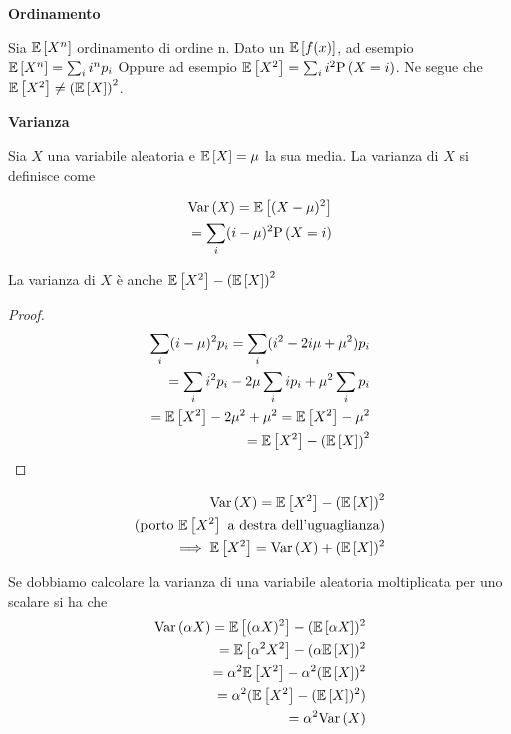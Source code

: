 \begin{defn}
	\textbf{Ordinamento}
	
	Sia $\mathbb{E}\left[X^n\right]$ ordinamento di ordine n.
	Dato un $ \mathbb{E}\left[f(x)\right] $, ad esempio $ \mathbb{E}\left[X^n\right] = \sum_i i^n p_i$
	Oppure ad esempio $ \mathbb{E}\left[X^2\right] = \sum_i i^2 \text{P}\left(X = i\right)$. Ne segue che $ \mathbb{E}\left[X^2\right] \neq \left(\mathbb{E}\left[X\right]\right)^2$.	
\end{defn}


\begin{defn}
	\textbf{Varianza}
	
	Sia $ X $ una variabile aleatoria e $ \mathbb{E}\left[X\right] = \mu $ la sua media.
	La varianza di $ X $ si definisce come 
	
	\begin{equation*}
	\begin{aligned}
	\text{Var}\left(X\right) = \mathbb{E}\left[(X-\mu)^2\right] \\ 
	= \sum_i (i-\mu)^2 \text{P}\left(X = i\right)
	\end{aligned}
	\end{equation*}
	
	La varianza di $ X $ è anche $ \mathbb{E}\left[X^2\right] - \left(\mathbb{E}\left[X\right]\right)^2 $
	
	\begin{proof}
		\begin{equation*}
		\begin{aligned}
		\sum_i (i-\mu)^2 p_i = \sum_i (i^2 -2i\mu + \mu^2) p_i \\
		= \sum_i i^2 p_i - 2\mu \sum_i i p_i + \mu^2 \sum_i p_i \\
		= \mathbb{E}\left[X^2\right] - 2\mu^2 + \mu^2 = \mathbb{E}\left[X^2\right] - \mu^2 \\
		= \mathbb{E}\left[X^2\right] - \left(\mathbb{E}\left[X\right]\right)^2 
		\end{aligned}
		\end{equation*}
	\end{proof}

	\begin{note}
		\begin{equation*}
		\begin{aligned}
			\text{Var}\left(X\right) = \mathbb{E}\left[X^2\right] - \left(\mathbb{E}\left[X\right]\right)^2 \\
			\text{(porto } \mathbb{E}\left[X^2\right] \text{ a destra dell'uguaglianza)} \\
			\implies \mathbb{E}\left[X^2\right] = \text{Var}\left(X\right) + (\mathbb{E}\left[X\right])^2 
		\end{aligned}
		\end{equation*}
	\end{note}

	\begin{note}
		Se dobbiamo calcolare la varianza di una variabile aleatoria moltiplicata per uno scalare si ha che
		\begin{equation*}
			\begin{aligned}
			\text{Var}\left(\alpha X\right) = \mathbb{E}\left[(\alpha X)^2\right] - (\mathbb{E}\left[\alpha X\right])^2 \\
			= \mathbb{E}\left[\alpha^2 X^2\right] - (\alpha \mathbb{E}\left[X\right])^2 \\
			= \alpha^2 \mathbb{E}\left[X^2\right] - \alpha^2(\mathbb{E}\left[X\right])^2 \\
			= \alpha^2 (\mathbb{E}\left[X^2\right] - (\mathbb{E}\left[X\right])^2) \\
			= \alpha^2 \text{Var}\left(X\right)
			\end{aligned}
		\end{equation*}
	\end{note}
\end{defn}
